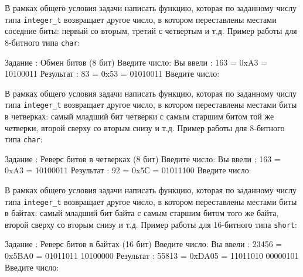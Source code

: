 
\begin{zztask}
В рамках общего условия задачи написать функцию, которая по заданному числу
типа \texttt{integer\_t} возвращает другое число, в котором переставлены
местами соседние биты: первый со вторым, третий с четвертым и т.д.
Пример работы для 8-битного типа \texttt{char}:
\begin{zzoutput}
  Задание \thezztask: Обмен битов (8 бит)
  Введите число: 
  Вы ввели  :  163 = 0xA3 = 10100011
  Результат :   83 = 0x53 = 01010011
  Введите число: \zzuser{ }
\end{zzoutput}
\end{zztask}


\begin{zztask}
В рамках общего условия задачи написать функцию, которая по заданному числу
типа \texttt{integer\_t} возвращает другое число, в котором переставлены
местами биты в четверках: самый младший бит четверки с самым старшим битом
той же четверки, второй сверху со вторым снизу и т.д.
Пример работы для 8-битного типа \texttt{char}:
\begin{zzoutput}
  Задание \thezztask: Реверс битов в четверках (8 бит)
  Введите число: 
  Вы ввели  :  163 = 0xA3 = 10100011
  Результат :   92 = 0x5С = 01011100
  Введите число: \zzuser{ }
\end{zzoutput}
\end{zztask}


\begin{zztask}
В рамках общего условия задачи написать функцию, которая по заданному числу
типа \texttt{integer\_t} возвращает другое число, в котором переставлены
местами биты в байтах: самый младший бит байта с самым старшим битом того
же байта, второй сверху со вторым снизу и т.д.
Пример работы для 16-битного типа \texttt{short}:
\begin{zzoutput}
  Задание \thezztask: Реверс битов в байтах (16 бит)
  Введите число: 
  Вы ввели  : 23456 = 0x5BA0 = 01011011 10100000
  Результат : 55813 = 0xDA05 = 11011010 00000101
  Введите число: \zzuser{ }
\end{zzoutput}
\end{zztask}


